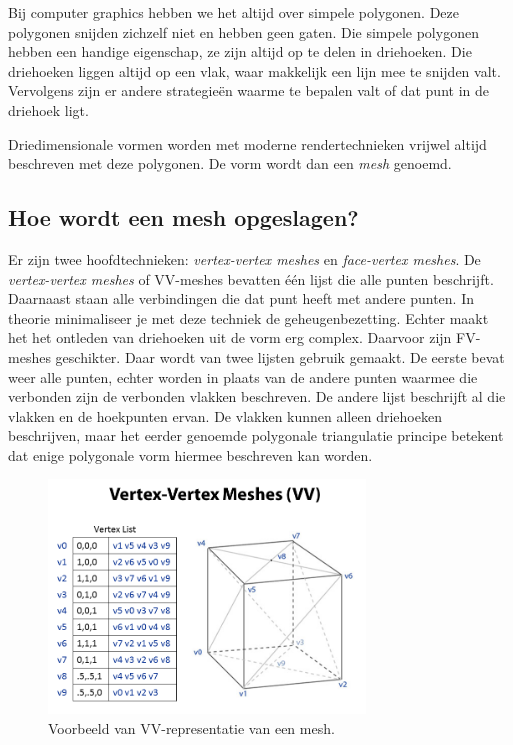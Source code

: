 \documentclass[12pt, a4paper]{article}
\begin{document}
Bij computer graphics hebben we het altijd over simpele polygonen. Deze polygonen snijden zichzelf niet en hebben geen gaten. Die simpele polygonen hebben een handige eigenschap, ze zijn altijd op te delen in driehoeken. Die driehoeken liggen altijd op een vlak, waar makkelijk een lijn mee te snijden valt. Vervolgens zijn er andere strategieën waarme te bepalen valt of dat punt in de driehoek ligt. 

Driedimensionale vormen worden met moderne rendertechnieken vrijwel altijd beschreven met deze polygonen. De vorm wordt dan een \emph{mesh} genoemd.

\subsection{Hoe wordt een mesh opgeslagen?}
Er zijn twee hoofdtechnieken: \emph{vertex-vertex meshes} \cite{VVSystems} en \emph{face-vertex meshes}. De \emph{vertex-vertex meshes} of VV-meshes bevatten één lijst die alle punten beschrijft. Daarnaast staan alle verbindingen die dat punt heeft met andere punten. In theorie minimaliseer je met deze techniek de geheugenbezetting. Echter maakt het het ontleden van driehoeken uit de vorm erg complex. Daarvoor zijn FV-meshes geschikter. Daar wordt van twee lijsten gebruik gemaakt. De eerste bevat weer alle punten, echter worden in plaats van de andere punten waarmee die verbonden zijn de verbonden vlakken beschreven. De andere lijst beschrijft al die vlakken en de hoekpunten ervan. De vlakken kunnen alleen driehoeken beschrijven, maar het eerder genoemde polygonale triangulatie principe betekent dat enige polygonale vorm hiermee beschreven kan worden.

\begin{figure}[H]
    \centering
    \includegraphics[width=0.75\textwidth]{Vertex-Vertex_Meshes.png}
    \caption{Voorbeeld van VV-representatie van een mesh.}
    \label{fig:vertex_vertex}
\end{figure}
\end{document}
